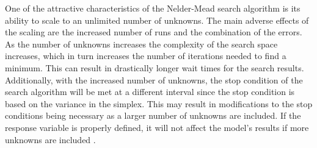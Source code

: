 \documentclass[pdflatex,sn-mathphys]{sn-jnl}
\begin{document}
	One of the attractive characteristics of the Nelder-Mead search algorithm is its ability to scale to an unlimited number of unknowns.  The main adverse effects of the scaling are the increased number of runs and the combination of the errors.  As the number of unknowns increases the complexity of the search space increases, which in turn increases the number of iterations needed to find a minimum.  This can result in drastically longer wait times for the search results.  Additionally, with the increased number of unknowns, the stop condition of the search algorithm will be met at a different interval since the stop condition is based on the variance in the simplex.  This may result in modifications to the stop conditions being necessary as a larger number of unknowns are included.  If the response variable is properly defined, it will not affect the model's results if more unknowns are included \cite{wang_2011}.
\end{document}
